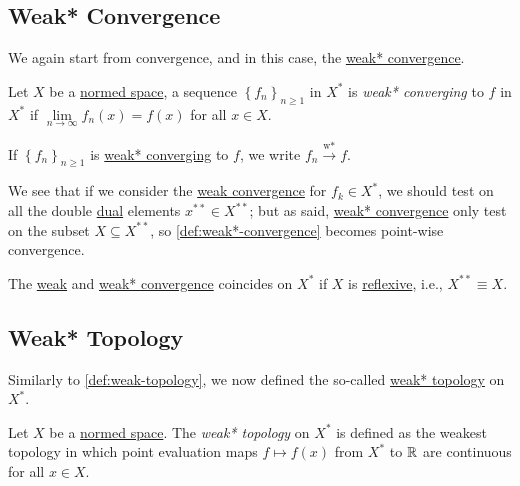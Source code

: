 \subsection{Weak* Convergence}
We again start from convergence, and in this case, the \hyperref[def:weak*-convergence]{weak* convergence}.

\begin{definition}\label{def:weak*-convergence}
	Let \(X\) be a \hyperref[def:normed-vector-space]{normed space}, a sequence \(\left\{ f_{n} \right\}_{n\geq 1} \) in \(X^{\ast} \) is \emph{weak* converging} to \(f\) in \(X^{\ast}\) if \(\lim\limits_{n \to \infty} f_n(x) = f(x)\) for all \(x\in X\).
\end{definition}

\begin{notation}
	If \(\left\{ f_n \right\}_{n\geq 1} \) is \hyperref[def:weak*-convergence]{weak* converging} to \(f\), we write \(f_n \overset{\text{w*}}{\to } f\).
\end{notation}

We see that if we consider the \hyperref[def:weakly-convergence]{weak convergence} for \(f_k \in X^{\ast} \), we should test on all the double \hyperref[def:dual-space]{dual} elements \(x^{\ast\ast}\in X^{\ast\ast}\); but as said, \hyperref[def:weak*-convergence]{weak* convergence} only test on the subset \(X \subseteq X^{\ast\ast}\), so \autoref{def:weak*-convergence} becomes point-wise convergence.

\begin{remark}
	The \hyperref[def:weakly-convergence]{weak} and \hyperref[def:weak*-convergence]{weak* convergence} coincides on \(X^{\ast} \) if \(X\) is \hyperref[def:reflexive-space]{reflexive}, i.e., \(X^{\ast\ast} \equiv X\).
\end{remark}

\subsection{Weak* Topology}
Similarly to \autoref{def:weak-topology}, we now defined the so-called \hyperref[def:weak*-topology]{weak* topology} on \(X^{\ast} \).

\begin{definition}\label{def:weak*-topology}
	Let \(X\) be a \hyperref[def:normed-vector-space]{normed space}. The \emph{weak* topology} on \(X^{\ast} \) is defined as the weakest topology in which point evaluation maps \(f\mapsto f(x)\) from \(X^{\ast} \) to \(\mathbb{\MakeUppercase{r}} \) are continuous for all \(x\in X\).
\end{definition}


